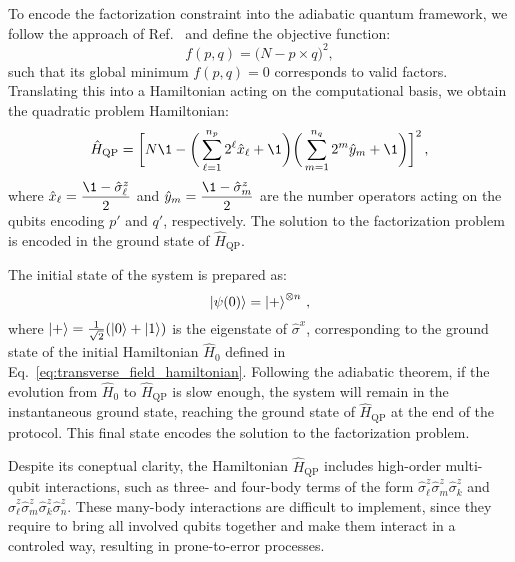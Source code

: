 To encode the factorization constraint into the adiabatic quantum framework, we follow
the approach of Ref.~\cite{hegade_digitized_2021} and define the objective function:
\begin{equation}
	f(p,q) = \big(N - p \times q \big)^2,
\end{equation}
such that its global minimum $f(p,q)=0$ corresponds to valid factors. Translating this
into a Hamiltonian acting on the computational basis, we obtain the quadratic problem Hamiltonian:
\begin{equation}
	\hat{H}_\mathrm{QP} = \bigg[ N \1 - \bigg( \sum_{\ell=1}^{n_p} 2^\ell \hat{x}_\ell + \1 \bigg)
	\bigg( \sum_{m=1}^{n_q} 2^m \hat{y}_m + \1 \bigg) \bigg]^2\,,
	\label{eq:quadratic_problem_hamiltonian}
\end{equation}
where $\hat{x}_\ell = \dfrac{\1 - \hat{\sigma}_\ell^z}{2}$ and $\hat{y}_m = \dfrac{\1 - \hat{\sigma}_m^z}{2}$
are the number operators acting on the qubits encoding $p'$ and $q'$, respectively. The solution
to the factorization problem is encoded in the ground state of $\hat{H}_\mathrm{QP}$.

The initial state of the system is prepared as:
\begin{equation}
	\ket{\psi(0)} = \ket{+}^{\otimes n}\,,
	\label{eq:initial_state}
\end{equation}
where $\ket{+} = \frac{1}{\sqrt{2}} (\ket{0} + \ket{1})$ is the eigenstate of $\hat{\sigma}^x$,
corresponding to the ground state of the initial Hamiltonian $\hat{H}_0$ defined in Eq.~\ref{eq:transverse_field_hamiltonian}.
Following the adiabatic theorem, if the evolution from $\hat{H}_0$ to $\hat{H}_\mathrm{QP}$
is slow enough, the system will remain in the instantaneous ground state, reaching the ground state of
$\hat{H}_\mathrm{QP}$ at the end of the protocol. This final state encodes the solution to the factorization
problem.

Despite its coneptual clarity, the Hamiltonian $\hat{H}_\mathrm{QP}$ includes high-order
multi-qubit interactions, such as three- and four-body terms of the form
$\hat{\sigma}_\ell^z \hat{\sigma}_m^z \hat{\sigma}_k^z$ and $\hat{\sigma}_\ell^z \hat{\sigma}_m^z \hat{\sigma}_k^z \hat{\sigma}_n^z$.
These many-body interactions are difficult to implement, since they require to bring
all involved qubits together and make them interact in a controled way, resulting in
prone-to-error processes.

